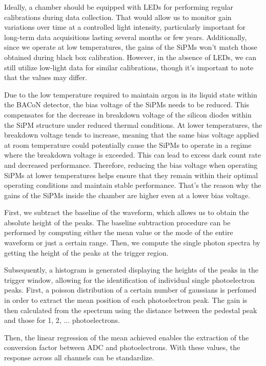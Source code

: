 \documentclass[11pt,a4paper,english,oneside, pdf]{article}
\begin{document}
	Ideally, a chamber should be equipped with LEDs for performing regular calibrations during data collection. That would allow us to monitor gain variations over time at a controlled light intensity, particularly important for long-term data acquisitions lasting several months or few years. Additionally, since we operate at low temperatures, the gains of the SiPMs won't match those obtained during black box calibration. However, in the absence of LEDs, we can still utilize low-light data for similar calibrations, though it's important to note that the values may differ.
	
	Due to the low temperature required to maintain argon in its liquid state within the BACoN detector, the bias voltage of the SiPMs needs to be reduced. This compensates for the decrease in breakdown voltage of the silicon diodes within the SiPM structure under reduced thermal conditions. At lower temperatures, the breakdown voltage tends to increase, meaning that the same bias voltage applied at room temperature could potentially cause the SiPMs to operate in a regime where the breakdown voltage is exceeded. This can lead to excess dark count rate and decreased performance. Therefore, reducing the bias voltage when operating SiPMs at lower temperatures helps ensure that they remain within their optimal operating conditions and maintain stable performance. That's the reason why the gains of the SiPMs inside the chamber are higher even at a lower bias voltage.
		

	
	First, we subtract the baseline of the waveform, which allows us to obtain the absolute height of the peaks. The baseline subtraction procedure can be performed by computing either the mean value or the mode of the entire waveform or just a certain range. 
	Then, we compute the single photon spectra by getting the height of the peaks at the trigger region. 

	
	Subsequently, a histogram is generated displaying the heights of the peaks in the trigger window, allowing for the identification of individual single photoelectron peaks. First, a poisson distribution of a certain number of gaussians is perfomed in order to extract the mean position of each photoelectron peak. The gain is then calculated from the spectrum using the distance between the pedestal peak and those for 1, 2, ...  photoelectrons.
	
	
	Then, the linear regression of the mean achieved enables the extraction of the conversion factor between ADC and photoelectrons. With these values, the response across all channels can be standardize.
	
\end{document}
